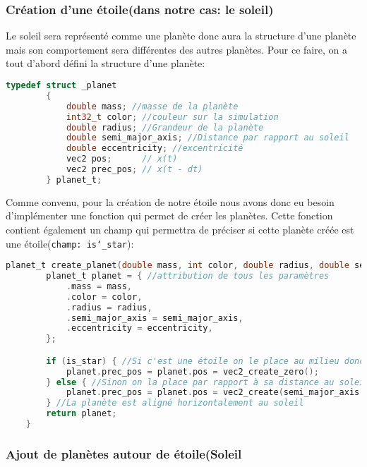\documentclass[a4paper,10pt]{article}
\begin{document}
    \subsubsection{Création d'une étoile(dans notre cas: le soleil)}

    Le soleil sera représenté comme une planète donc aura la structure d'une planète mais son comportement sera différentes des autres planètes.
    Pour ce faire, on a tout d'abord défini la structure d'une planète:

    \begin{lstlisting}[language=c,label={lst:lstlisting}]
        typedef struct _planet
        {
            double mass; //masse de la planète
            int32_t color; //couleur sur la simulation
            double radius; //Grandeur de la planète
            double semi_major_axis; //Distance par rapport au soleil
            double eccentricity; //excentricité
            vec2 pos;      // x(t)
            vec2 prec_pos; // x(t - dt)
        } planet_t;
    \end{lstlisting}

    Comme convenu, pour la création de notre étoile nous avons donc eu besoin d'implémenter une fonction qui permet de créer les planètes.
    Cette fonction contient également un champ qui permettra de préciser si cette planète créée est une étoile(\texttt{champ: is\char`_star}):
    
    \begin{lstlisting}[language=c,label={lst:lstlisting2}]
        planet_t create_planet(double mass, int color, double radius, double semi_major_axis, double eccentricity, bool is_star) {
        planet_t planet = { //attribution de tous les paramètres
            .mass = mass,
            .color = color,
            .radius = radius,
            .semi_major_axis = semi_major_axis,
            .eccentricity = eccentricity,
        };

        if (is_star) { //Si c'est une étoile on le place au milieu donc vecteur 0
            planet.prec_pos = planet.pos = vec2_create_zero();
        } else { //Sinon on la place par rapport à sa distance au soleil(étoile) et son excentricité
            planet.prec_pos = planet.pos = vec2_create(semi_major_axis * (1 - eccentricity), 0);
        } //La planète est aligné horizontalement au soleil
        return planet;
    }
    \end{lstlisting}
    
    \subsubsection{Ajout de planètes autour de étoile(Soleil}
\end{document}
